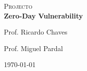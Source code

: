 \begin{titlepage}
\begin{center}
		\textsc{\Large Projecto}\\[1.5cm]


		{ \huge \bfseries Zero-Day Vulnerability \\[2.5cm] }


		\noindent

		\begin{minipage}{0.4\textwidth}
			\begin{flushleft} \Large
				Prof. Ricardo Chaves
			\end{flushleft}
		\end{minipage}
		\begin{minipage}{0.4\textwidth}
			\begin{flushright} \Large
				Prof. Miguel Pardal
			\end{flushright}
		\end{minipage}

		\vfill

		{\large \today}

	\end{center}

\end{titlepage}